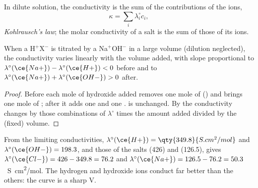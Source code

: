 \begin{proposition}\label{prop:b1:titration-methods:kohlrausch}
In dilute solution, the conductivity is the sum of the contributions of
the ions,
\[
  \kappa = \sum_i \lambda_i^\circ c_i ,
\]
\emph{Kohlrausch's law}; the molar conductivity of
a salt is the sum of those of its ions.
\end{proposition}


\begin{proposition}\label{prop:b1:titration-methods:conductimetric-slopes}
When a  H$^+$X$^-$ is titrated by a 
Na$^+$OH$^-$ in a large volume (dilution neglected), the conductivity
varies linearly with the volume added, with slope proportional to
$\lambda^\circ(\ce{Na+}) - \lambda^\circ(\ce{H+}) < 0$ before
 and to $\lambda^\circ(\ce{Na+}) + \lambda^\circ(\ce{OH-}) > 0$
after.
\end{proposition}

\begin{proof}
Before  each mole of hydroxide added removes one mole of
 () and brings one mole of ; after
 it adds one  and one .  is unchanged.
By  the conductivity changes by those combinations of
$\lambda^\circ$ times the amount added divided by the (fixed) volume.
\end{proof}

From the limiting conductivities, $\lambda^\circ(\ce{H+}) =
\qty{349.8}{S.cm^2/mol}$ and $\lambda^\circ(\ce{OH-}) = 198.3$, and those
of the salts  (426) and  (126.5),  gives
$\lambda^\circ(\ce{Cl-}) = 426 - 349.8 = 76.2$ and $\lambda^\circ(\ce{Na+}) =
126.5 - 76.2 = 50.3$~\unit{S.cm^2/mol}. The hydrogen and hydroxide ions
conduct far better than the others: the curve is a sharp V.

